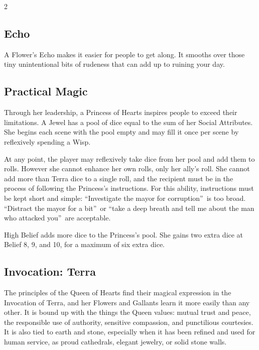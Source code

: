 \begin{multicols}{2}
\subsection*{Echo}
A Flower's Echo makes it easier for people to get along. It smooths over those tiny unintentional bits of rudeness that can add up to ruining your day.
\subsection*{Practical Magic}
Through her leadership, a Princess of Hearts inspires people to exceed their limitations. A Jewel has a pool of dice equal to the sum of her Social Attributes. She begins each scene with the pool empty and may fill it once per scene by reflexively spending a Wisp.

At any point, the player may reflexively take dice from her pool and add them to rolls. However she cannot enhance her own rolls, only her ally's roll. She cannot add more than Terra dice to a single roll, and the recipient must be in the process of following the Princess's instructions. For this ability, instructions must be kept short and simple: \textquotedblleft Investigate the mayor for corruption\textquotedblright\, is too broad. \textquotedblleft Distract the mayor for a bit\textquotedblright\, or \textquotedblleft take a deep breath and tell me about the man who attacked you\textquotedblright\, are acceptable.

High Belief adds more dice to the Princess's pool. She gains two extra dice at Belief 8, 9, and 10, for a maximum of six extra dice. 

\subsection*{Invocation: Terra}
The principles of the Queen of Hearts find their magical expression in the Invocation of Terra, and her Flowers and Gallants learn it more easily than any other. It is bound up with the things the Queen values: mutual trust and peace, the responsible use of authority, sensitive compassion, and punctilious courtesies. It is also tied to earth and stone, especially when it has been refined and used for human service, as proud cathedrals, elegant jewelry, or solid stone walls.


\end{multicols}
